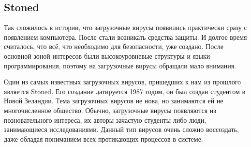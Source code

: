 \subsection{Stoned}
Так сложилось в истории, что загрузочные вирусы появились практически сразу с появлением компьютера.
После стали возникать средства защиты.
И долгое время считалось,
	что всё, что необходимо для безопасности, уже создано.
После основной зоной интересов были высокоуровневые структуры и языки программирования, поэтому на загрузочные вирусы обращали мало внимания.

Один из самых известных загрузочных вирусов,
	пришедших к нам из прошлого является Stoned\cite{proj:stoned}.
Его создание датируется 1987 годом,
	он был создан студентом в Новой Зеландии.
Тема загрузочных вирусов не нова,
	но занимаются ей не многочисленное общество.
Обычно, загрузочные вирусы появляются из позновательного интереса,
	их авторы зачастую студенты либо люди,
		занимающиеся исследованиями.
Данный тип вирусов очень сложно воссоздать,
	даже обладая пониманием всех протикающих процессов в системе.

